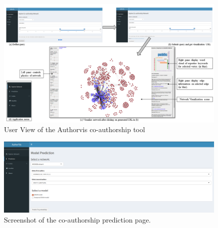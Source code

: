 \begin{figure}
\centering
\includegraphics[scale=0.68]{Chapters/authorvis/userView2}
\caption{User View of the Authorvis co-authorship tool}
\label{av_userView}
\end{figure}

\begin{figure}[!ht]
\centering
\hspace{-1.5cm}\includegraphics[scale=0.26]{Chapters/authorvis/screen3}
\caption{Screenshot of the co-authorship prediction page.}
\label{net_vis}
\end{figure}


